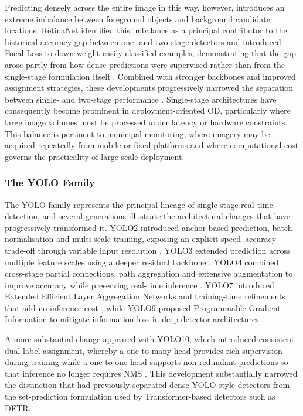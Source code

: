 Predicting densely across the entire image in this way, however, introduces an extreme imbalance between foreground objects and background candidate locations. RetinaNet identified this imbalance as a principal contributor to the historical accuracy gap between one- and two-stage detectors and introduced Focal Loss to down-weight easily classified examples, demonstrating that the gap arose partly from how dense predictions were supervised rather than from the single-stage formulation itself \cite{lin2017focal}. Combined with stronger backbones and improved assignment strategies, these developments progressively narrowed the separation between single- and two-stage performance \cite{zou2023objectdetection}. Single-stage architectures have consequently become prominent in deployment-oriented \gls{OD}, particularly where large image volumes must be processed under latency or hardware constraints. This balance is pertinent to municipal monitoring, where imagery may be acquired repeatedly from mobile or fixed platforms and where computational cost governs the practicality of large-scale deployment.

\subsubsection{The \gls{YOLO} Family}
\label{sec:bg-yolo}
The \gls{YOLO} family represents the principal lineage of single-stage real-time detection, and several generations illustrate the architectural changes that have progressively transformed it. \gls{YOLO}2 introduced anchor-based prediction, batch normalisation and multi-scale training, exposing an explicit speed--accuracy trade-off through variable input resolution \cite{redmon2017yolo9000}. \gls{YOLO}3 extended prediction across multiple feature scales using a deeper residual backbone \cite{redmon2018yolov3}. \gls{YOLO}4 combined cross-stage partial connections, path aggregation and extensive augmentation to improve accuracy while preserving real-time inference \cite{bochkovskiy2020yolov4}. \gls{YOLO}7 introduced Extended Efficient Layer Aggregation Networks and training-time refinements that add no inference cost \cite{wang2023yolov7}, while \gls{YOLO}9 proposed Programmable Gradient Information to mitigate information loss in deep detector architectures \cite{wang2024yolov9}.

A more substantial change appeared with \gls{YOLO}10, which introduced consistent dual label assignment, whereby a one-to-many head provides rich supervision during training while a one-to-one head supports non-redundant predictions so that inference no longer requires \gls{NMS} \cite{wang2024yolov10}. This development substantially narrowed the distinction that had previously separated dense \gls{YOLO}-style detectors from the set-prediction formulation used by Transformer-based detectors such as \gls{DETR}.

